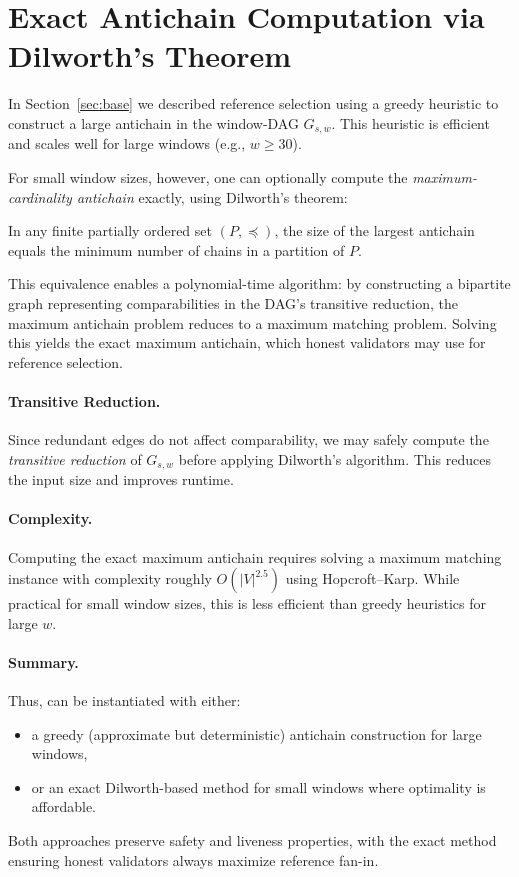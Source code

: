 \section{Exact Antichain Computation via Dilworth's Theorem}
\label{sec:appendix-dilworth}

In Section~\ref{sec:base} we described reference selection using a greedy heuristic to construct a large antichain in the window-DAG $G_{s,w}$. This heuristic is efficient and scales well for large windows (e.g., $w \ge 30$). 

For small window sizes, however, one can optionally compute the \emph{maximum-cardinality antichain} exactly, using Dilworth's theorem:

\begin{theorem}[Dilworth, 1950]
In any finite partially ordered set $(P,\preceq)$, the size of the largest antichain equals the minimum number of chains in a partition of $P$.
\end{theorem}

This equivalence enables a polynomial-time algorithm: by constructing a bipartite graph representing comparabilities in the DAG's transitive reduction, the maximum antichain problem reduces to a maximum matching problem. Solving this yields the exact maximum antichain, which honest validators may use for reference selection.

\paragraph{Transitive Reduction.}
Since redundant edges do not affect comparability, we may safely compute the \emph{transitive reduction} of $G_{s,w}$ before applying Dilworth’s algorithm. This reduces the input size and improves runtime.

\paragraph{Complexity.}
Computing the exact maximum antichain requires solving a maximum matching instance with complexity roughly $O(|V|^{2.5})$ using Hopcroft–Karp. While practical for small window sizes, this is less efficient than greedy heuristics for large $w$.

\paragraph{Summary.}
Thus, \Proj can be instantiated with either:
\begin{itemize}
  \item a greedy (approximate but deterministic) antichain construction for large windows,
  \item or an exact Dilworth-based method for small windows where optimality is affordable.
\end{itemize}
Both approaches preserve safety and liveness properties, with the exact method ensuring honest validators always maximize reference fan-in.

